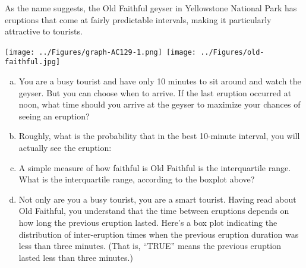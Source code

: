
As the name suggests, the Old Faithful geyser in Yellowstone National
Park has eruptions that come at fairly predictable intervals, making
it particularly attractive to tourists.

\centerline{\hbox{\texttt{[image: ../Figures/graph-AC129-1.png]}
   \hspace*{.25in}\texttt{[image: ../Figures/old-faithful.jpg]}}}


\begin{enumerate}[(a)]

\item You are a busy tourist and have only 10 minutes to sit around and
watch the geyser.  But you can choose when to arrive.  If the last
eruption occurred at noon, what time should you arrive at the geyser
to maximize your chances of seeing an eruption?
\begin{MultipleChoice}
\end{MultipleChoice}


\item Roughly, what is the probability that in the best 10-minute interval,
you will actually see the eruption:
\begin{MultipleChoice}
\end{MultipleChoice}

\item A simple measure of how faithful is Old Faithful is the interquartile
range.  What is the interquartile range, according to the
boxplot above?
\begin{MultipleChoice}
\end{MultipleChoice}

\item Not only are you a busy tourist, you are a smart tourist.  Having read
about Old Faithful, you understand that the time between eruptions
depends on how long the previous eruption lasted.   Here's a box
plot indicating the distribution of inter-eruption times when the
previous eruption duration was less than three minutes.  (That is, ``TRUE'' means the previous eruption lasted less than three minutes.)


\end{enumerate}
